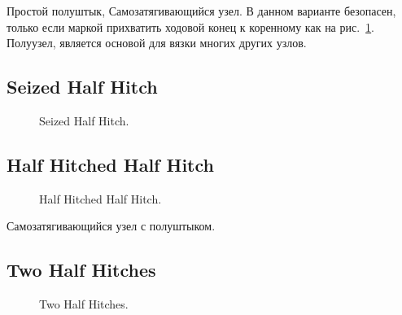 Простой полуштык, Самозатягивающийся узел. В данном варианте безопасен, только если маркой прихватить ходовой конец к коренному как на рис.~\ref{ris:Half_Hitch_seized}. Полуузел, является основой для вязки многих других узлов.

\subsection{Seized Half Hitch}

\begin{figure}[H]\centering
	\begin{minipage}{1\linewidth}
		\begin{center}
			\tcbox[enhanced jigsaw,colframe=black,opacityframe=0.5,opacityback=0.5]
			{\centering{}}
		\end{center}
	\end{minipage}
\caption{Seized Half Hitch.}
\label{ris:Half_Hitch_seized}
\end{figure}

\subsection{Half Hitched Half Hitch}

\begin{figure}[H]\centering
	\begin{minipage}{1\linewidth}
		\begin{center}
			\tcbox[enhanced jigsaw,colframe=black,opacityframe=0.5,opacityback=0.5]
			{\centering{}}
		\end{center}
	\end{minipage}
\caption{Half Hitched Half Hitch.}
\label{ris:Half_Hitched_Half_Hitch}
\end{figure}

Самозатягивающийся узел с полуштыком.

\subsection{Two Half Hitches}

\begin{figure}[H]\centering
	\subfloat[Правильный]{\label{ris:Two_Half_Hitches_1}
	\tcbox[enhanced jigsaw,colframe=black,opacityframe=0.5,opacityback=0.5]
		{\centering
			}
		}
\hfil
	\subfloat[Перевернутый]{\label{ris:Two_Half_Hitches_2}
	\tcbox[enhanced jigsaw,colframe=black,opacityframe=0.5,opacityback=0.5]
		{\centering
			}
		}
	\caption{Two Half Hitches.}\label{ris:Two_Half_Hitches}
\end{figure}

